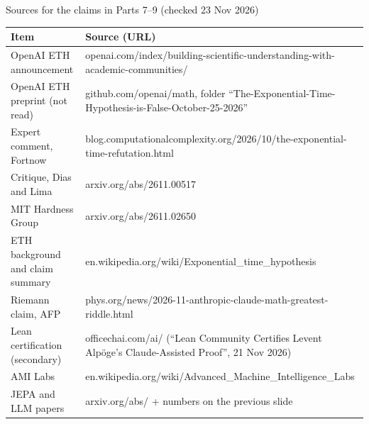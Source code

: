 \begin{frame}{Sources for the claims in Parts 7--9 (checked 23 Nov 2026)}
\begin{sfig}[0.86]
\scriptsize\begin{tabular}{@{}L{46mm}L{90mm}@{}}
\toprule
\textbf{Item} & \textbf{Source (URL)}\\\midrule
OpenAI ETH announcement & openai.com/\allowbreak{}index/\allowbreak{}building-scientific-understanding-with-academic-communities/\allowbreak{}\\
OpenAI ETH preprint (not read) & github.com/\allowbreak{}openai/\allowbreak{}math, folder ``The-Exponential-Time-Hypothesis-is-False-October-25-2026''\\
Expert comment, Fortnow & blog.computationalcomplexity.org/\allowbreak{}2026/\allowbreak{}10/\allowbreak{}the-exponential-time-refutation.html\\
Critique, Dias and Lima & arxiv.org/\allowbreak{}abs/\allowbreak{}2611.00517\\
MIT Hardness Group & arxiv.org/\allowbreak{}abs/\allowbreak{}2611.02650\\
ETH background and claim summary & en.wikipedia.org/\allowbreak{}wiki/\allowbreak{}Exponential\_time\_hypothesis\\
Riemann claim, AFP & phys.org/\allowbreak{}news/\allowbreak{}2026-11-anthropic-claude-math-greatest-riddle.html\\
Lean certification (secondary) & officechai.com/ai/ (``Lean Community Certifies Levent Alp\"oge's Claude-Assisted Proof'', 21 Nov 2026)\\
AMI Labs & en.wikipedia.org/\allowbreak{}wiki/\allowbreak{}Advanced\_Machine\_Intelligence\_Labs\\
JEPA and LLM papers & arxiv.org/\allowbreak{}abs/\allowbreak{} + numbers on the previous slide\\\bottomrule
\end{tabular}
\end{sfig}
\end{frame}
